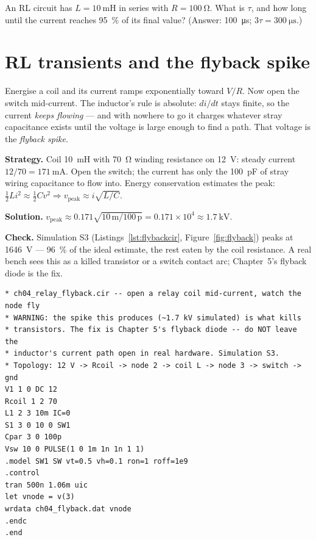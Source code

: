 \begin{exercise}[easy]
An RL circuit has $L=\qty{10}{\milli\henry}$ in series with
$R=\qty{100}{\ohm}$. What is $\tau$, and how long until the current reaches
\qty{95}{\percent} of its final value? (Answer: \qty{100}{\micro\second};
$3\tau=\qty{300}{\micro\second}$.)
\end{exercise}

\section{RL transients and the flyback spike}
\label{sec:flyback}

Energise a coil and its current ramps exponentially toward $V/R$. Now open
the switch mid-current. The inductor's rule is absolute: $di/dt$ stays
finite, so the current \emph{keeps flowing} — and with nowhere to go it
charges whatever stray capacitance exists until the voltage is large enough
to find a path. That voltage is the \emph{flyback spike}.

\begin{example}
\label{ex:flyback}
\textbf{Strategy.} Coil \qty{10}{\milli\henry} with \qty{70}{\ohm} winding
resistance on \qty{12}{\volt}: steady current $12/70=\qty{171}{\milli\ampere}$.
Open the switch; the current has only the \qty{100}{\pico\farad} of stray
wiring capacitance to flow into. Energy conservation estimates the peak:
$\tfrac12 Li^2 \approx \tfrac12 Cv^2 \Rightarrow
v_{\mathrm{peak}}\approx i\sqrt{L/C}$.

\textbf{Solution.} $v_{\mathrm{peak}}\approx
0.171\sqrt{10\,\mathrm{m}/100\,\mathrm{p}} = 0.171\times10^{4}
\approx \qty{1.7}{\kilo\volt}$.

\textbf{Check.} Simulation S3 (Listings~\ref{lst:flybackcir},
Figure~\ref{fig:flyback}) peaks at \qty{1646}{\volt} — \qty{96}{\percent} of
the ideal estimate, the rest eaten by the coil resistance. A real bench sees
this as a killed transistor or a switch contact arc; Chapter~5's flyback
diode is the fix.
\end{example}

\begin{lstlisting}[language={},caption={\texttt{code/ch04\_relay\_flyback.cir} — simulation S3. The warning comment in the file is the point of the exercise.},label=lst:flybackcir]
* ch04_relay_flyback.cir -- open a relay coil mid-current, watch the node fly
* WARNING: the spike this produces (~1.7 kV simulated) is what kills
* transistors. The fix is Chapter 5's flyback diode -- do NOT leave the
* inductor's current path open in real hardware. Simulation S3.
* Topology: 12 V -> Rcoil -> node 2 -> coil L -> node 3 -> switch -> gnd
V1 1 0 DC 12
Rcoil 1 2 70
L1 2 3 10m IC=0
S1 3 0 10 0 SW1
Cpar 3 0 100p
Vsw 10 0 PULSE(1 0 1m 1n 1n 1 1)
.model SW1 SW vt=0.5 vh=0.1 ron=1 roff=1e9
.control
tran 500n 1.06m uic
let vnode = v(3)
wrdata ch04_flyback.dat vnode
.endc
.end
\end{lstlisting}

